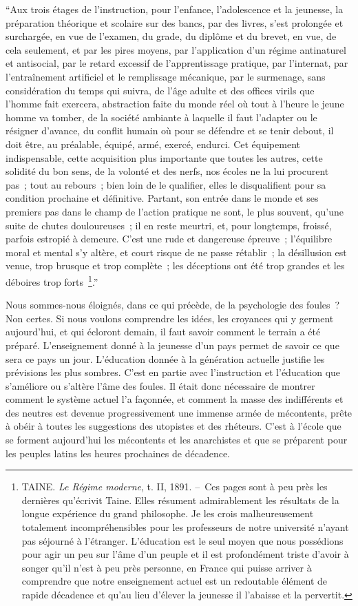\documentclass[french,twoside]{book} %
\begin{document}
“Aux trois étages de l’instruction, pour l’enfance, l’adolescence et la jeunesse, la préparation théorique et scolaire sur des bancs, par des livres, s’est prolongée et surchargée, en vue de l’examen, du grade, du diplôme et du brevet, en vue, de cela seulement, et par les pires moyens, par l’application d’un régime antinaturel et anti­social, par le retard excessif de l’apprentissage pratique, par l’internat, par l’entraîne­ment artificiel et le remplissage mécanique, par le surmenage, sans considération du temps qui suivra, de l’âge adulte et des offices virils que l’homme fait exercera, abstraction faite du monde réel où tout à l’heure le jeune homme va tomber, de la société ambiante à laquelle il faut l’adapter ou le résigner d’avance, du conflit humain où pour se défendre et se tenir debout, il doit être, au préalable, équipé, armé, exercé, endurci. Cet équipement indispensable, cette acquisition plus importante que toutes les autres, cette solidité du bon sens, de la volonté et des nerfs, nos écoles ne la lui procurent pas ; tout au rebours ; bien loin de le qualifier, elles le disqualifient pour sa condition prochaine et définitive. Partant, son entrée dans le monde et ses premiers pas dans le champ de l’action pratique ne sont, le plus souvent, qu’une suite de chutes douloureuses ; il en reste meurtri, et, pour longtemps, froissé, parfois estropié à demeure. C’est une rude et dangereuse épreuve ; l’équilibre moral et mental s’y altère, et court risque de ne passe rétablir ; la désillusion est venue, trop brusque et trop com­plète ; les déceptions ont été trop grandes et les déboires trop forts \footnote{TAINE. \emph{Le Régime moderne}, t. II, 1891. – Ces pages sont à peu près les dernières qu’écrivit Taine. Elles résument admirablement les résultats de la longue expérience du grand philosophe. Je les crois malheureusement totalement incom­préhensibles pour les professeurs de notre université n’ayant pas séjourné à l’étranger. L’éducation est le seul moyen que nous possédions pour agir un peu sur l’âme d’un peuple et il est profondément triste d’avoir à songer qu’il n’est à peu près personne, en France qui puisse arriver à comprendre que notre enseignement actuel est un redou­table élément de rapide décadence et qu’au lieu d’élever la jeunesse il l’abaisse et la pervertit.}.”\par
Nous sommes-nous éloignés, dans ce qui précède, de la psychologie des foules ? Non certes. Si nous voulons comprendre les idées, les croyances qui y germent aujourd’hui, et qui écloront demain, il faut savoir comment le terrain a été préparé. L’enseignement donné à la jeunesse d’un pays permet de savoir ce que sera ce pays un jour. L’éducation donnée à la génération actuelle justifie les prévisions les plus som­bres. C’est en partie avec l’instruction et l’éducation que s’améliore ou s’altère l’âme des foules. Il était donc nécessaire de montrer comment le système actuel l’a façon­née, et comment la masse des indifférents et des neutres est devenue progressivement une immense armée de mécontents, prête à obéir à toutes les suggestions des utopistes et des rhéteurs. C’est à l’école que se forment aujourd’hui les mécontents et les anar­chistes et que se préparent pour les peuples latins les heures prochaines de décadence.
\end{document}
